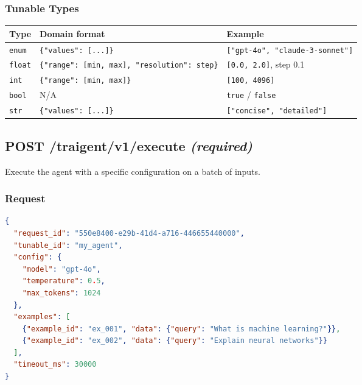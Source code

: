 \documentclass[11pt,a4paper]{article}
\begin{document}
\subsubsection{Tunable Types}

\begin{center}\small
\begin{tabularx}{\textwidth}{@{}llX@{}}
\toprule
\textbf{Type} & \textbf{Domain format} & \textbf{Example} \\
\midrule
\texttt{enum}  & \texttt{\{"values": [...]\}} & \texttt{["gpt-4o", "claude-3-sonnet"]} \\
\texttt{float} & \texttt{\{"range": [min, max], "resolution": step\}} & \texttt{[0.0, 2.0]}, step 0.1 \\
\texttt{int}   & \texttt{\{"range": [min, max]\}} & \texttt{[100, 4096]} \\
\texttt{bool}  & N/A & \texttt{true} / \texttt{false} \\
\texttt{str}   & \texttt{\{"values": [...]\}} & \texttt{["concise", "detailed"]} \\
\bottomrule
\end{tabularx}
\end{center}

\subsection{POST /traigent/v1/execute \normalfont\textit{(required)}}\label{sec:execute}

Execute the agent with a specific configuration on a batch of inputs.

\subsubsection{Request}

\begin{lstlisting}[language=json]
{
  "request_id": "550e8400-e29b-41d4-a716-446655440000",
  "tunable_id": "my_agent",
  "config": {
    "model": "gpt-4o",
    "temperature": 0.5,
    "max_tokens": 1024
  },
  "examples": [
    {"example_id": "ex_001", "data": {"query": "What is machine learning?"}},
    {"example_id": "ex_002", "data": {"query": "Explain neural networks"}}
  ],
  "timeout_ms": 30000
}
\end{lstlisting}
\end{document}
